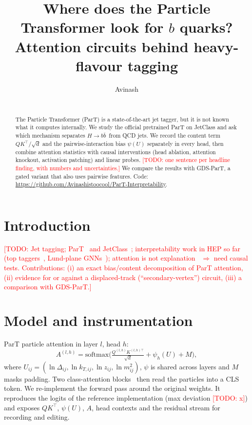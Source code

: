 \documentclass[10pt]{article}
\title{Where does the Particle Transformer look for $b$ quarks?\\
Attention circuits behind heavy-flavour tagging}
\author{Avinash \\ \todo{affiliation} \\ \texttt{\todo{email}}}
\date{}
\newcommand{\todo}[1]{\textcolor{red}{[TODO: #1]}}
\newcommand{\Hbb}{\ensuremath{H\to b\bar b}}
\begin{document}
\maketitle

\begin{abstract}
The Particle Transformer (ParT) is a state-of-the-art jet tagger, but it is not known what it computes internally.
We study the official pretrained ParT on JetClass and ask which mechanism separates \Hbb\ from QCD jets.
We record the content term $QK^\top/\sqrt d$ and the pairwise-interaction bias $\psi(U)$ separately in every
head, then combine attention statistics with causal interventions (head ablation, attention knockout,
activation patching) and linear probes.
\todo{one sentence per headline finding, with numbers and uncertainties.}
We compare the results with GDS-ParT, a gated variant that also uses pairwise features.
Code: \url{https://github.com/Avinashistoocool/ParT-Interpretability}.
\end{abstract}

\section{Introduction}
\todo{Jet tagging; ParT~\cite{qu2022part} and JetClass~\cite{jetclass}; interpretability work in HEP so far (top taggers~\cite{khot2023},
Lund-plane GNNs~\cite{dreyer2021}); attention is not explanation~\cite{jain2019} $\Rightarrow$ need causal tests.
Contributions: (i) an exact bias/content decomposition of ParT attention, (ii) evidence for or against a
displaced-track (``secondary-vertex'') circuit, (iii) a comparison with GDS-ParT.}

\section{Model and instrumentation}
ParT particle attention in layer $l$, head $h$:
\begin{equation}
A^{(l,h)} = \mathrm{softmax}\!\Big(\tfrac{Q^{(l,h)}K^{(l,h)\top}}{\sqrt d} + \psi_h(U) + M\Big),
\end{equation}
where $U_{ij}=(\ln\Delta_{ij},\ln k_{T,ij},\ln z_{ij},\ln m^2_{ij})$, $\psi$ is shared across layers and $M$ masks padding.
Two class-attention blocks~\cite{cait} then read the particles into a CLS token. We re-implement the forward
pass around the original weights. It reproduces the logits of the reference implementation (max deviation
\todo{x}) and exposes $QK^\top$, $\psi(U)$, $A$, head contexts and the residual stream for recording and editing.
\end{document}
